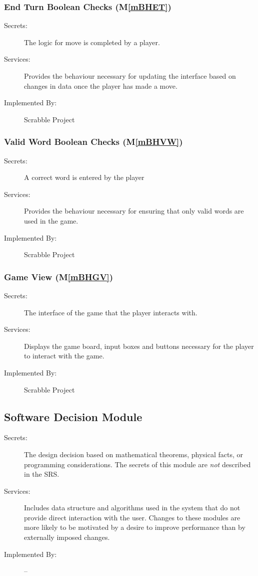 \documentclass[12pt, titlepage]{article}
\newcommand{\mref}[1]{M\ref{#1}}
\begin{document}
\subsubsection{End Turn Boolean Checks (\mref{mBHET})}
\begin{description}
\item[Secrets:]The logic for move is completed by a player.
\item[Services:] Provides the behaviour necessary for updating the interface based on changes in data once the player has made a move.
\item[Implemented By:] Scrabble Project
\end{description}

\subsubsection{Valid Word Boolean Checks (\mref{mBHVW})}
\begin{description}
\item[Secrets:]A correct word is entered by the player
\item[Services:] Provides the behaviour necessary for ensuring that only valid words are used in the game.
\item[Implemented By:] Scrabble Project
\end{description}

\subsubsection{Game View (\mref{mBHGV})}
\begin{description}
\item[Secrets:]The interface of the game that the player interacts with.
\item[Services:]Displays the game board, input boxes and buttons necessary for the player to interact with the game.
\item[Implemented By:] Scrabble Project
\end{description}




\subsection{Software Decision Module}
\begin{description}
\item[Secrets:] The design decision based on mathematical theorems, physical
  facts, or programming considerations. The secrets of this module are
  \emph{not} described in the SRS.
\item[Services:] Includes data structure and algorithms used in the system that
  do not provide direct interaction with the user. Changes to these modules are more likely to be motivated by a desire to improve performance than by externally imposed changes.
\item[Implemented By:] --
\end{description}
\end{document}
